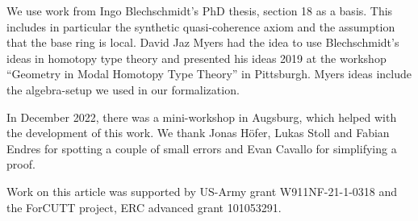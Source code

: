 We use work from Ingo Blechschmidt's PhD thesis, section 18 as a basis.
This includes in particular the synthetic quasi-coherence axiom and the assumption that the base ring is local.
David Jaz Myers had the idea to use Blechschmidt's ideas in homotopy type theory
and presented his ideas 2019 at the workshop ``Geometry in Modal Homotopy Type Theory'' in Pittsburgh.
Myers ideas include the algebra-setup we used in our formalization.

In December 2022, there was a mini-workshop in Augsburg, which helped with the development of this work.
We thank Jonas Höfer, Lukas Stoll and Fabian Endres for spotting a couple of small errors and Evan Cavallo for simplifying a proof.

Work on this article was supported by US-Army grant W911NF-21-1-0318 and the ForCUTT project, ERC advanced grant 101053291.
